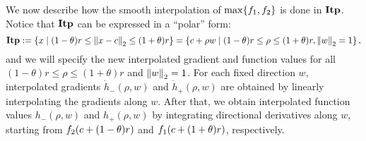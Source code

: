 We now describe how the smooth interpolation of $\max\{f_{1}, f_{2}\}$ is done in $\mathbf{Itp}$. 
Notice that $\mathbf{Itp}$ can be expressed in a ``polar'' form:
\begin{equation*}
	\mathbf{Itp} 
	:= \left \{ x \mid (1-\theta)r \leq \left\|{x-c}\right\|_2 \leq (1+\theta)r \right \}
	= \left \{ 
	c + \rho w 
	\mid
	(1-\theta) r \leq \rho \leq (1+\theta) r, 
	\left\|{w}\right\|_2 = 1
	\right \},
\end{equation*}
and we will specify the new interpolated gradient and function values for all $(1-\theta) r \leq \rho \leq (1+\theta) r$ and $\left\|{w}\right\|_2 = 1$.
For each fixed direction $w$,
interpolated gradients $\dot h_-(\rho, w)$ and $\dot h_+(\rho, w)$ are obtained by
linearly interpolating the gradients along $w$.
After that, we obtain interpolated function values $h_-(\rho, w)$ and $h_+(\rho, w)$ 
by integrating directional derivatives along $w$, starting from $f_{2}(c+(1-\theta)r)$ and $f_{1}(c+(1+\theta)r)$, respectively.

